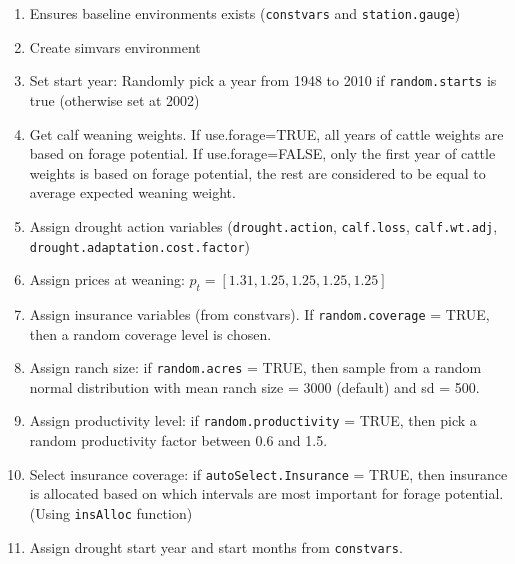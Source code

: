 \documentclass[11pt]{article}
\begin{document}
\begin{enumerate}
\item Ensures baseline environments exists (\verb!constvars! and \verb!station.gauge!)
\item Create simvars environment
\item Set start year: Randomly pick a year from 1948 to 2010 if \verb!random.starts! is true (otherwise set at 2002)
\item Get calf weaning weights. If use.forage=TRUE, all years of cattle weights are based on forage potential. If use.forage=FALSE, only the first year of cattle weights is based on forage potential, the rest are considered to be equal to average expected weaning weight.
\item Assign drought action variables (\verb!drought.action!, \verb!calf.loss!, \verb!calf.wt.adj!, \verb!drought.adaptation.cost.factor!)
\item Assign prices at weaning: $p_t = [1.31, 1.25, 1.25, 1.25, 1.25]$
\item Assign insurance variables (from constvars). If \verb!random.coverage! = TRUE, then a random coverage level is chosen.
\item Assign ranch size: if \verb!random.acres! = TRUE, then sample from a random normal distribution with  mean ranch size = 3000 (default) and sd = 500. 
\item Assign productivity level: if \verb!random.productivity! = TRUE, then pick a random productivity factor between 0.6 and 1.5.
\item Select insurance coverage: if \verb!autoSelect.Insurance! = TRUE, then insurance is allocated based on which intervals are most important for forage potential. (Using \verb!insAlloc! function)
\item Assign drought start year and start months from \verb!constvars!.
\end{enumerate}
\end{document}
